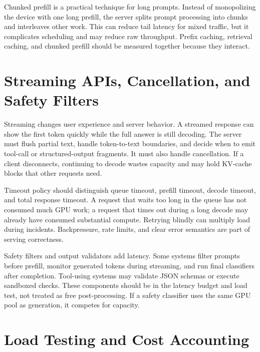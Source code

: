 Chunked prefill is a practical technique for long prompts. Instead of monopolizing the device with one long prefill, the server splits prompt processing into chunks and interleaves other work. This can reduce tail latency for mixed traffic, but it complicates scheduling and may reduce raw throughput. Prefix caching, retrieval caching, and chunked prefill should be measured together because they interact.

\section{Streaming APIs, Cancellation, and Safety Filters}
\label{sec:streaming-cancellation}

Streaming changes user experience and server behavior. A streamed response can show the first token quickly while the full answer is still decoding. The server must flush partial text, handle token-to-text boundaries, and decide when to emit tool-call or structured-output fragments. It must also handle cancellation. If a client disconnects, continuing to decode wastes capacity and may hold KV-cache blocks that other requests need.

Timeout policy should distinguish queue timeout, prefill timeout, decode timeout, and total response timeout. A request that waits too long in the queue has not consumed much GPU work; a request that times out during a long decode may already have consumed substantial compute. Retrying blindly can multiply load during incidents. Backpressure, rate limits, and clear error semantics are part of serving correctness.

Safety filters and output validators add latency. Some systems filter prompts before prefill, monitor generated tokens during streaming, and run final classifiers after completion. Tool-using systems may validate JSON schemas or execute sandboxed checks. These components should be in the latency budget and load test, not treated as free post-processing. If a safety classifier uses the same GPU pool as generation, it competes for capacity.

\section{Load Testing and Cost Accounting}
\label{sec:load-testing-cost}

